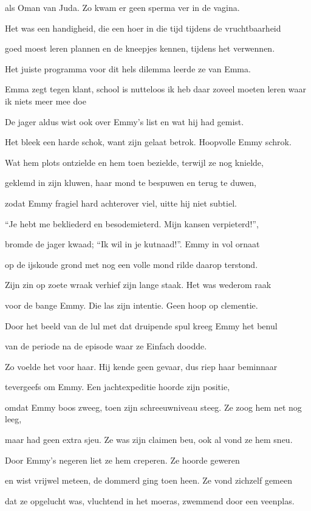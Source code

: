 als Oman van Juda.
Zo kwam er geen sperma
ver in de vagina.

Het was een handigheid,
die een hoer in die tijd
tijdens de vruchtbaarheid

goed moest leren plannen
en de kneepjes kennen,
tijdens het verwennen.

Het juiste programma
voor dit hels dilemma
leerde ze van Emma.

Emma zegt tegen klant, school is nutteloos ik heb daar zoveel moeten leren waar ik niets meer mee doe

De jager aldus wist
ook over Emmy’s list
en wat hij had gemist.

Het bleek een harde schok,
want zijn gelaat betrok.
Hoopvolle Emmy schrok.

Wat hem plots ontzielde
en hem toen bezielde,
terwijl ze nog knielde,

geklemd in zijn kluwen,
haar mond te bespuwen
en terug te duwen,

zodat Emmy fragiel
hard achterover viel,
uitte hij niet subtiel.

“Je hebt me bekliederd
en besodemieterd.
Mijn kansen verpieterd!”,

bromde de jager kwaad;
“Ik wil in je kutnaad!”.
Emmy in vol ornaat

op de ijskoude grond
met nog een volle mond
rilde daarop terstond.

Zijn zin op zoete wraak
verhief zijn lange staak.
Het was wederom raak

voor de bange Emmy.
Die las zijn intentie.
Geen hoop op clementie.

Door het beeld van de lul
met dat druipende spul
kreeg Emmy het benul

van de periode
na de episode
waar ze Einfach doodde.

Zo voelde het voor haar.
Hij kende geen gevaar,
dus riep haar beminnaar

tevergeefs om Emmy.
Een jachtexpeditie
hoorde zijn positie,

omdat Emmy boos zweeg, toen zijn schreeuwniveau steeg.
Ze zoog hem net nog leeg,

maar had geen extra sjeu.
Ze was zijn claimen beu,
ook al vond ze hem sneu.

Door Emmy’s negeren
liet ze hem creperen.
Ze hoorde geweren

en wist vrijwel meteen,
de dommerd ging toen heen.
Ze vond zichzelf gemeen

dat ze opgelucht was,
vluchtend in het moeras,
zwemmend door een veenplas.
